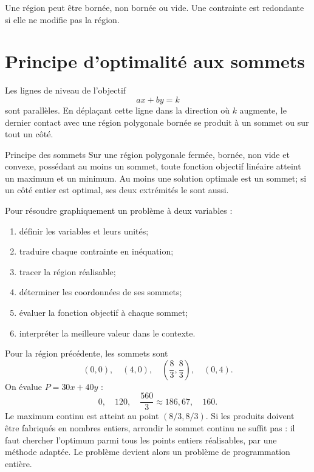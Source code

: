 Une région peut être bornée, non bornée ou vide. Une contrainte est redondante si elle ne modifie pas la région.

\section{Principe d'optimalité aux sommets}
\label{manual:section:13.03}

Les lignes de niveau de l'objectif
\[
ax+by=k
\]
sont parallèles. En déplaçant cette ligne dans la direction où $k$ augmente, le dernier contact avec une région polygonale bornée se produit à un sommet ou sur tout un côté.

\begin{theorem}{Principe des sommets}{}
Sur une région polygonale fermée, bornée, non vide et convexe, possédant au moins un sommet, toute fonction objectif linéaire atteint un maximum et un minimum. Au moins une solution optimale est un sommet; si un côté entier est optimal, ses deux extrémités le sont aussi.
\end{theorem}

\begin{methodbox}
Pour résoudre graphiquement un problème à deux variables :
\begin{enumerate}
\item définir les variables et leurs unités;
\item traduire chaque contrainte en inéquation;
\item tracer la région réalisable;
\item déterminer les coordonnées de ses sommets;
\item évaluer la fonction objectif à chaque sommet;
\item interpréter la meilleure valeur dans le contexte.
\end{enumerate}
\end{methodbox}

\begin{examplebox}
Pour la région précédente, les sommets sont
\[
(0,0),\quad(4,0),\quad\left(\frac83,\frac83\right),\quad(0,4).
\]
On évalue $P=30x+40y$ :
\[
0,\quad120,\quad\frac{560}{3}\approx186{,}67,\quad160.
\]
Le maximum continu est atteint au point $(8/3,8/3)$. Si les produits doivent être fabriqués en nombres entiers, arrondir le sommet continu ne suffit pas : il faut chercher l'optimum parmi tous les points entiers réalisables, par une méthode adaptée. Le problème devient alors un problème de programmation entière.
\end{examplebox}

